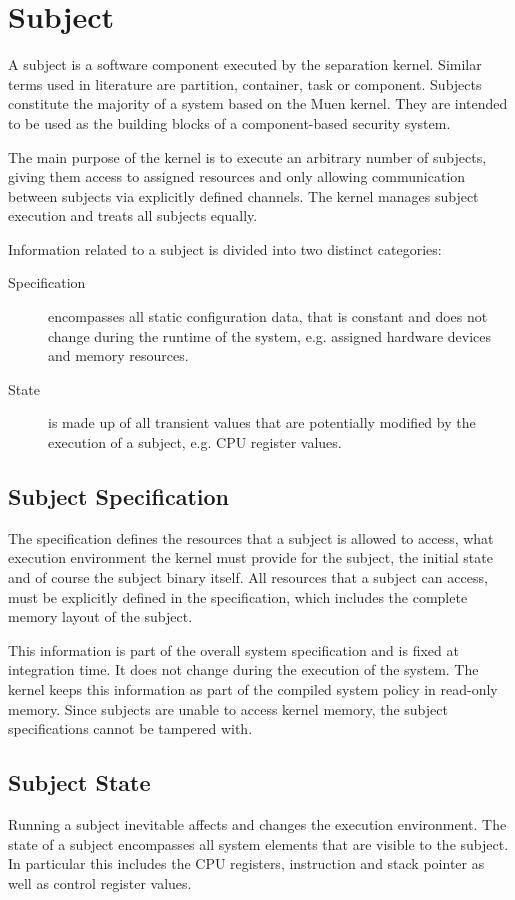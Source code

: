 \section{Subject}\label{sec:design-subject}
A subject is a software component executed by the separation kernel. Similar
terms used in literature are partition, container, task or component. Subjects
constitute the majority of a system based on the Muen kernel. They are intended
to be used as the building blocks of a component-based security system.

The main purpose of the kernel is to execute an arbitrary number of subjects,
giving them access to assigned resources and only allowing communication between
subjects via explicitly defined channels. The kernel manages subject execution
and treats all subjects equally.

Information related to a subject is divided into two distinct categories:

\begin{description}
	\item[Specification] encompasses all static configuration data, that is
		constant and does not change during the runtime of the system, e.g.
		assigned hardware devices and memory resources.
	\item[State] is made up of all transient values that are potentially
		modified by the execution of a subject, e.g. CPU register values.
\end{description}

\subsection{Subject Specification}
The specification defines the resources that a subject is allowed to access,
what execution environment the kernel must provide for the subject, the initial
state and of course the subject binary itself. All resources that a subject can
access, must be explicitly defined in the specification, which includes the
complete memory layout of the subject.

This information is part of the overall system specification and is fixed at
integration time. It does not change during the execution of the system. The
kernel keeps this information as part of the compiled system policy in read-only
memory. Since subjects are unable to access kernel memory, the subject
specifications cannot be tampered with.

\subsection{Subject State}
Running a subject inevitable affects and changes the execution environment. The
state of a subject encompasses all system elements that are visible to the
subject. In particular this includes the CPU registers, instruction and stack
pointer as well as control register values.

